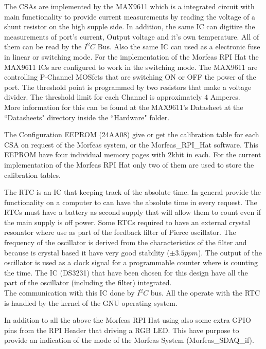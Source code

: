 The CSAs are implemented by the MAX9611 which is a integrated circuit with main functionality to provide current measurements by reading the voltage of a shunt resistor on the high supple side.
In addition, the same IC can digitize the measurements of port's current, Output voltage and it's own temperature. All of them can be read by the $I^2C$ Bus.
Also the same IC can used as a electronic fuse in linear or switching mode.
For the implementation of the Morfeas RPI Hat the MAX9611 ICs are configured to work in the switching mode.
The MAX9611 are controlling P-Channel MOSfets that are switching ON or OFF the power of the port.
The threshold point is programmed by two resistors that make a voltage divider. The threshold limit for each Channel is approximately 4 Amperes.\\
More information for this can be found at the MAX9611's Datasheet at the ``Datasheets" directory inside the ``Hardware" folder.

The Configuration EEPROM (24AA08) give or get the calibration table for each CSA on request of the Morfeas system, or the Morfeas\_RPI\_Hat software.
This EEPROM have four individual memory pages with 2kbit in each.
For the current implementation of the Morfeas RPI Hat only two of them are used to store the calibration tables.

The RTC is an IC that keeping track of the absolute time. In general provide the functionality on a computer to can have the absolute time in every request.
The RTCs must have a battery as second supply that will allow them to count even if the main supply is off power.
Some RTCs required to have an external crystal resonator where use as part of the feedback filter of Pierce oscillator.
The frequency of the oscillator is derived from the characteristics of the filter and because is crystal based it have very good stability ($\pm3.5ppm$).
The output of the oscillator is used as a clock signal for a programmable counter where is counting the time.
The IC (DS3231) that have been chosen for this design have all the part of the oscillator (including the filter) integrated.\\
The communication with this IC done by $I^2C$ bus. All the operate with the RTC is handled by the kernel of the GNU operating system.

In addition to all the above the Morfeas RPI Hat using also some extra GPIO pins from the RPI Header that driving a RGB LED.
This have purpose to provide an indication of the mode of the Morfeas System (Morfeas\_SDAQ\_if).


